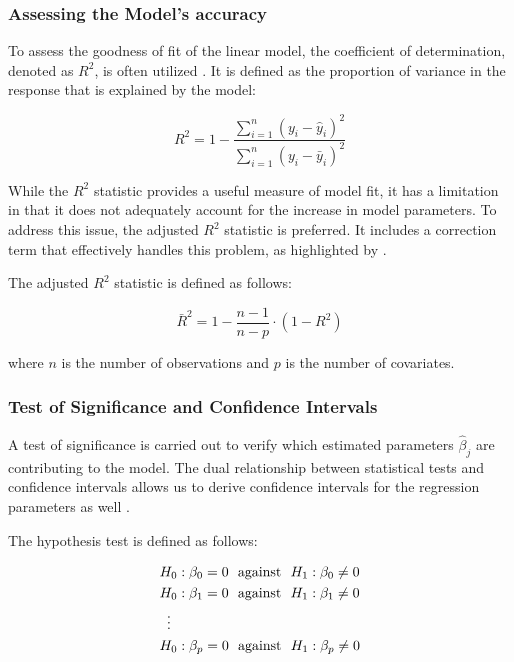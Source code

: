 \documentclass[12 pt]{scrartcl}
\numberwithin{equation}{section}
\begin{document}
\subsubsection*{Assessing the Model's accuracy}
\label{subsubsec:Assessing the Model's accuracy}

To assess the goodness of fit of the linear model, the coefficient of determination, denoted as $R^2$, is often utilized
\citep[p. 112]{regression}. 
It is defined as the proportion of variance in the response that is explained by the model:

\begin{equation}
    R^2 = 1 -\frac{\sum_{i=1}^n (y_{i} - \hat{y}_{i})^2}{\sum_{i=1}^n (y_{i} - \bar{y}_{i})^2}
\end{equation}

While the $R^2$ statistic provides a useful measure of model fit, it has a limitation in that it
 does not adequately account for the increase in model parameters. 
 To address this issue, the adjusted $R^2$ statistic is preferred. 
 It includes a correction term that effectively handles this problem,
 as highlighted by \citep[p.148]{regression}.

 The adjusted $R^2$ statistic is defined as follows:

    \begin{equation}
        \bar{R}^2 = 1 -\frac{n-1}{n-p} \cdot (1 - R^2)    
    \end{equation}

where $n$ is the number of observations and $p$ is the number of covariates.

\subsubsection*{Test of Significance and Confidence Intervals}
\label{subsubsec:tests}

A test of significance is carried out to verify which estimated parameters $\hat{\beta}_{j}$
are contributing to the model.
The dual relationship between statistical tests and confidence intervals 
allows us to derive confidence intervals for the regression parameters as well \cite[p.126]{regression}.

The hypothesis test is defined as follows:

\begin{align*}
    & H_{0}: \beta_{0} = 0  \,\, \text{ against } \,\, H_{1}: \beta_{0} \neq 0  \\
    & H_{0}: \beta_{1} = 0  \,\, \text{ against } \,\, H_{1}: \beta_{1} \neq 0 \\
     &\mathrel{\makebox[\widthof{=}]{\vdots}} \\
    & H_{0}: \beta_{p} = 0  \,\, \text{ against } \,\, H_{1}: \beta_{p} \neq 0 \\
\end{align*}
\label{eq:hypothesis}
\end{document}
